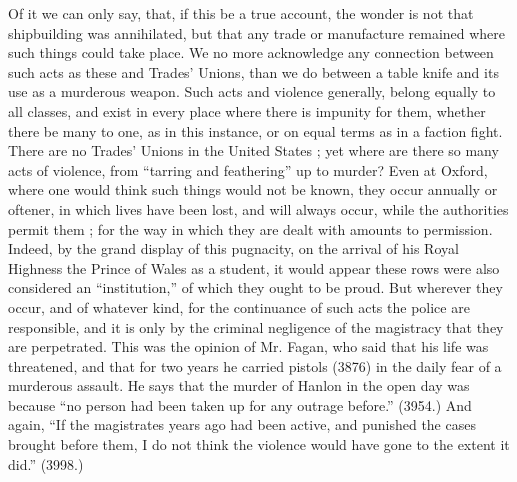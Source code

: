 Of it we can only say, that, if this be a true account, the wonder is
not that shipbuilding was annihilated, but that any trade or manufacture
remained where such things could take place. We no more acknowledge any
connection between such acts as these and Trades' Unions, than we do
between a table knife and its use as a murderous weapon. Such acts and
violence generally, belong equally to all classes, and exist in every
place where there is impunity for them, whether there be many to one, as
in this instance, or on equal terms as in a faction fight. There are no
Trades' Unions in the United States ; yet where are there so many acts
of violence, from ``tarring and feathering'' up to murder? Even at
Oxford, where one would think such things would not be known, they occur
annually or oftener, in which lives have been lost, and will always
occur, while the authorities permit them ; for the way in which they are
dealt with amounts to permission. Indeed, by the grand display of this
pugnacity, on the arrival of his Royal Highness the Prince of Wales as a
student, it would appear these rows were also considered an
``institution,'' of which they ought to be proud. But wherever they
occur, and of whatever kind, for the continuance of such acts the police
are responsible, and it is only by the criminal negligence of the
magistracy that they are perpetrated. This was the opinion of Mr. Fagan,
who said that his life was threatened, and that for two years he carried
pistols (3876) in the daily fear of a murderous assault. He says that
the murder of Hanlon in the open day was because ``no person had been
taken up for any outrage before.'' (3954.) And again, ``If the
magistrates years ago had been active, and punished the cases brought
before them, I do not think the violence would have gone to the extent
it did.'' (3998.)

